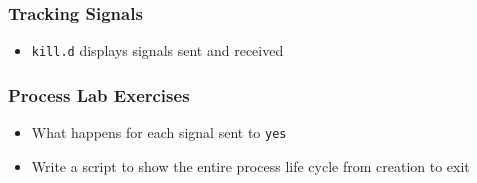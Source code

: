 \documentclass[pdftex]{beamer}
\begin{document}
\begin{frame}[fragile]
  \frametitle{Tracking Signals}
  \begin{itemize}
  \item \verb+kill.d+ displays signals sent and received
  \end{itemize}
\end{frame}

\begin{frame}[fragile]
  \frametitle{Process Lab Exercises}
  \begin{itemize}
  \item What happens for each signal sent to \verb+yes+
  \item Write a script to show the entire process life cycle from creation
    to exit
  \end{itemize}
\end{frame}
\end{document}
